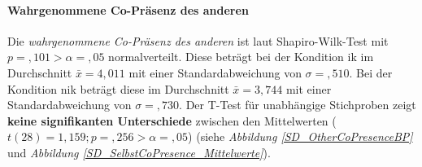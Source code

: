 \documentclass[a4paper,11pt]{article}%
\renewcommand{\\}{\vspace*{0.5\baselineskip} \newline}
\begin{document}
{\paragraph{Wahrgenommene Co-Präsenz des anderen}
Die \textit{wahrgenommene Co-Präsenz des anderen} ist laut Shapiro-Wilk-Test mit $p =,101 > \alpha = ,05$ normalverteilt.
Diese beträgt bei der Kondition \ac{ik} im Durchschnitt $\bar{x} = 4,011$ mit einer Standardabweichung von $\sigma =,510$.
Bei der Kondition \ac{nik} beträgt diese im Durchschnitt $\bar{x} = 3,744$ mit einer Standardabweichung von $\sigma = ,730$. 
Der T-Test für unabhängige Stichproben zeigt \textbf{keine signifikanten Unterschiede} zwischen den Mittelwerten ($t(28) = 1,159; p =,256 > \alpha = ,05$) (siehe \textit{Abbildung \ref{SD_OtherCoPresenceBP}} und \textit{Abbildung \ref{SD_SelbstCoPresence_Mittelwerte}}).

}
\end{document}
